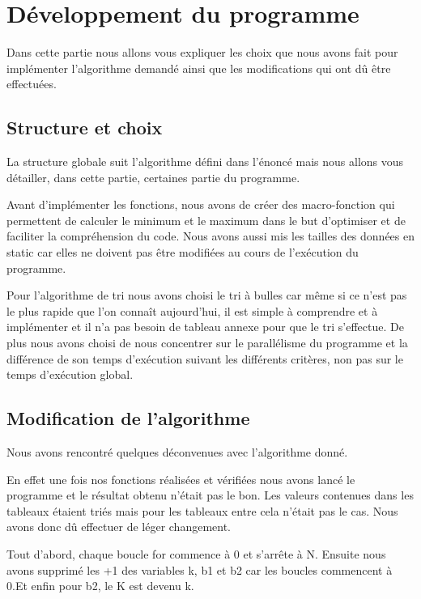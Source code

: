 \documentclass[12pt]{article}
\begin{document}
\section{Développement du programme}

    Dans cette partie nous allons vous expliquer les choix que nous avons fait pour implémenter l'algorithme demandé ainsi que les modifications qui ont dû être effectuées.

\subsection{Structure et choix}

    La structure globale suit l'algorithme défini dans l'énoncé mais nous allons vous détailler, dans cette partie, certaines partie du programme.
    
    Avant d'implémenter les fonctions, nous avons de créer des macro-fonction qui permettent de calculer le minimum et le maximum dans le but d'optimiser et de faciliter la compréhension du code. Nous avons aussi mis les tailles des données en static car elles ne doivent pas être modifiées au cours de l'exécution du programme.
    
    Pour l'algorithme de tri nous avons choisi le tri à bulles car même si ce n'est pas le plus rapide que l'on connaît aujourd'hui, il est simple à comprendre et à implémenter et il n'a pas besoin de tableau annexe pour que le tri s'effectue. De plus nous avons choisi de nous concentrer sur le parallélisme du programme et la différence de son temps d'exécution suivant les différents critères, non pas sur le temps d'exécution global.


\subsection{Modification de l'algorithme}

    Nous avons rencontré quelques déconvenues avec l'algorithme donné. 
    
    En effet une fois nos fonctions réalisées et vérifiées nous avons lancé le programme et le résultat obtenu n'était pas le bon. Les valeurs contenues dans les tableaux étaient triés mais pour les tableaux entre cela n'était pas le cas. Nous avons donc dû effectuer de léger changement.
    
    Tout d'abord, chaque boucle for commence à 0 et s'arrête à N.
    Ensuite nous avons supprimé les +1 des variables k, b1 et b2 car les boucles commencent à 0.Et enfin pour b2, le K est devenu k. 
\end{document}
